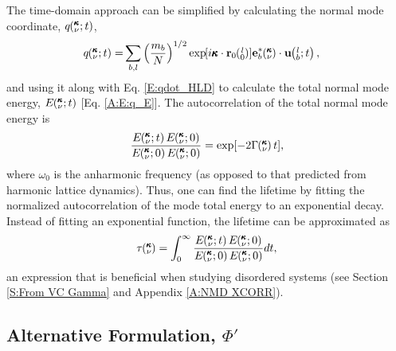 The time-domain approach can be simplified by calculating the 
normal mode coordinate, $q\mspace{-4.0mu}\left(\mspace{-8.0mu} \begin{smallmatrix}&\pmb{\kappa} \\&\nu\end{smallmatrix} \mspace{-2.0mu};t\right)$, 
\begin{equation}\label{E:q_HLD}
\begin{split}
q\kvt=& \sum_{b,l} \left(\frac{m_b}{N}\right)^{1/2} \EXP{i\pmb{\kappa}
\cdot\mathbf{r}_0\ab{l}{0}} \mathbf{e}_b^*\kv \cdot \mathbf{u}\lbt,
\end{split}
\end{equation}
and using it along with Eq. \eqref{E:qdot_HLD} to calculate the 
total normal mode energy, $E\mspace{-4.0mu}\left(\mspace{-8.0mu} \begin{smallmatrix}&\pmb{\kappa} \\&\nu\end{smallmatrix} \mspace{-2.0mu};t\right)$ [Eq. \eqref{A:E:q_E}]. 
The autocorrelation of the total normal mode energy is 
\begin{equation}\label{E:E_xcorr}
\begin{split}
\frac{E\kvt E\kvzero}{E \kvzero E\kvzero} = \exp[-2 \Gamma \kv t],
\end{split}
\end{equation}
where $\omega_0$ is the anharmonic frequency (as opposed to that predicted 
from harmonic lattice dynamics). 
Thus, one can find the lifetime by fitting the normalized autocorrelation 
of the mode total energy to an exponential decay. Instead of fitting an 
exponential function, the lifetime can be approximated as
\begin{equation}\label{E:tau_E_xcorr}
\begin{split}
\tau \kv = \int_0^{\infty} \frac{E\kvt E\kvzero}{E \kvzero E\kvzero} 
dt,
\end{split}
\end{equation}
an expression that is beneficial when studying disordered systems 
(see Section \ref{S:From VC Gamma} and Appendix \ref{A:NMD XCORR}).  

\subsection{\label{S:Subsection_Proposed_SED}Alternative Formulation, 
$\Phi'$}

